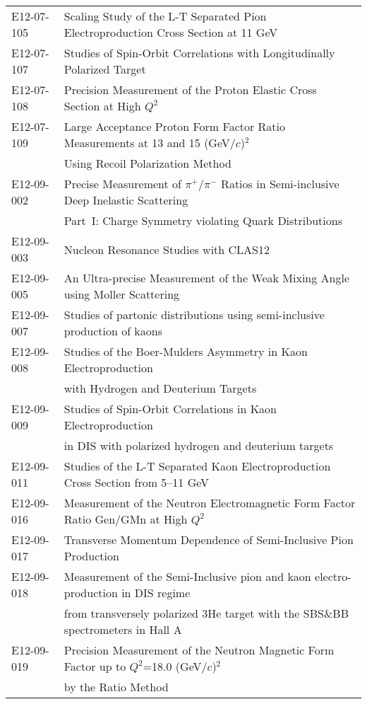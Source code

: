 \begin{tabular}{ll}
E12-07-105 & Scaling Study of the L-T Separated Pion Electroproduction Cross Section at 11 GeV\\
E12-07-107 & Studies of Spin-Orbit Correlations with Longitudinally Polarized Target\\
E12-07-108 & Precision Measurement of the Proton Elastic Cross Section at High $Q^2$\\
E12-07-109 & Large Acceptance Proton Form Factor Ratio Measurements at 13 and 15 (GeV$/c$)$^2$\\
& Using Recoil Polarization Method\\
E12-09-002 & Precise Measurement of $\pi^+/\pi^-$ Ratios in Semi-inclusive Deep Inelastic Scattering\\
& Part~I: Charge Symmetry violating Quark Distributions\\
E12-09-003 & Nucleon Resonance Studies with CLAS12\\
E12-09-005 & An Ultra-precise Measurement of the Weak Mixing Angle using Moller Scattering\\
E12-09-007 & Studies of partonic distributions using semi-inclusive production of kaons\\
E12-09-008 & Studies of the Boer-Mulders Asymmetry in Kaon Electroproduction\\
& with Hydrogen and Deuterium Targets\\
E12-09-009 & Studies of Spin-Orbit Correlations in Kaon Electroproduction\\
& in DIS with polarized hydrogen and deuterium targets\\
E12-09-011 & Studies of the L-T Separated Kaon Electroproduction Cross Section from 5--11 GeV\\
E12-09-016 & Measurement of the Neutron Electromagnetic Form Factor Ratio Gen/GMn at High $Q^2$\\
E12-09-017 & Transverse Momentum Dependence of Semi-Inclusive Pion Production\\
E12-09-018 & Measurement of the Semi-Inclusive pion and kaon electro-production in DIS regime\\
& from transversely polarized 3He target with the SBS\&BB spectrometers in Hall A\\
E12-09-019 & Precision Measurement of the Neutron Magnetic Form Factor up to $Q^2$=18.0 (GeV$/c$)$^2$\\
& by the Ratio Method
\end{tabular}

